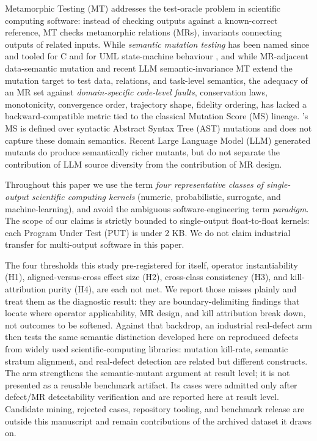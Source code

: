 \documentclass[manuscript,screen,review]{acmart}
\begin{document}
Metamorphic Testing (MT) addresses the test-oracle problem in scientific
computing software: instead of checking outputs against a known-correct
reference, MT checks metamorphic relations (MRs), invariants connecting
outputs of related inputs. While \emph{semantic mutation testing} has
been named since \citet{clark2010semanticmut} and tooled for C \citep{dan2012smtc}
and for UML state-machine behaviour \citep{derezinska2019uml}, and while
MR-adjacent data-semantic mutation \citep{sun2016mumt,sun2024datamutation,zhu2020datamorphic,chan2024metamorphic}
and recent LLM semantic-invariance MT \citep{curto2025semanticinvariance} extend the mutation target
to test data, relations, and task-level semantics, the adequacy of an MR
set against \emph{domain-specific code-level faults}, conservation laws,
monotonicity, convergence order, trajectory shape, fidelity ordering,
has lacked a backward-compatible metric tied to the classical Mutation
Score (MS) lineage. \citeauthor{jia2011analysis}'s \citeyearpar{jia2011analysis} MS is defined over syntactic
Abstract Syntax Tree (AST) mutations and does not capture these domain
semantics. Recent Large Language Model (LLM) generated mutants \citep{tip2025llmorpheus,humbatova2021deepcrime} do
produce semantically richer mutants, but do not separate the
contribution of LLM source diversity from the contribution of MR design.

Throughout this paper we use the term \emph{four representative classes
of single-output scientific computing kernels} (numeric, probabilistic,
surrogate, and machine-learning), and avoid the ambiguous
software-engineering term \emph{paradigm}. The scope of our claims is
strictly bounded to single-output float-to-float kernels: each
Program Under Test (PUT) is under 2 KB. We do not claim industrial transfer
for multi-output software in this paper.

The four thresholds this study pre-registered for itself, operator
instantiability (H1), aligned-versus-cross effect size (H2), cross-class
consistency (H3), and kill-attribution purity (H4), are each not met. We
report those misses plainly and treat them as the diagnostic result:
they are boundary-delimiting findings that locate where operator
applicability, MR design, and kill attribution break down, not outcomes
to be softened. Against that backdrop, an industrial real-defect arm
then tests the same semantic distinction developed here on reproduced
defects from widely used scientific-computing libraries: mutation
kill-rate, semantic stratum alignment, and real-defect detection are
related but different constructs. The arm strengthens the semantic-mutant argument at result
level; it is not presented as a reusable benchmark artifact. Its cases
were admitted only after defect/MR detectability verification and are
reported here at result level. Candidate mining, rejected cases,
repository tooling, and benchmark release are outside this manuscript
and remain contributions of the archived dataset it draws on.
\end{document}

